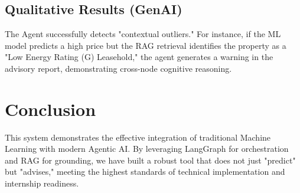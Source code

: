 \documentclass[12pt,a4paper]{article}
\begin{document}
\subsection{Qualitative Results (GenAI)}
The Agent successfully detects "contextual outliers." For instance, if the ML model predicts a high price but the RAG retrieval identifies the property as a "Low Energy Rating (G) Leasehold," the agent generates a warning in the advisory report, demonstrating cross-node cognitive reasoning.

\section{Conclusion}
This system demonstrates the effective integration of traditional Machine Learning with modern Agentic AI. By leveraging LangGraph for orchestration and RAG for grounding, we have built a robust tool that does not just "predict" but "advises," meeting the highest standards of technical implementation and internship readiness.
\end{document}
